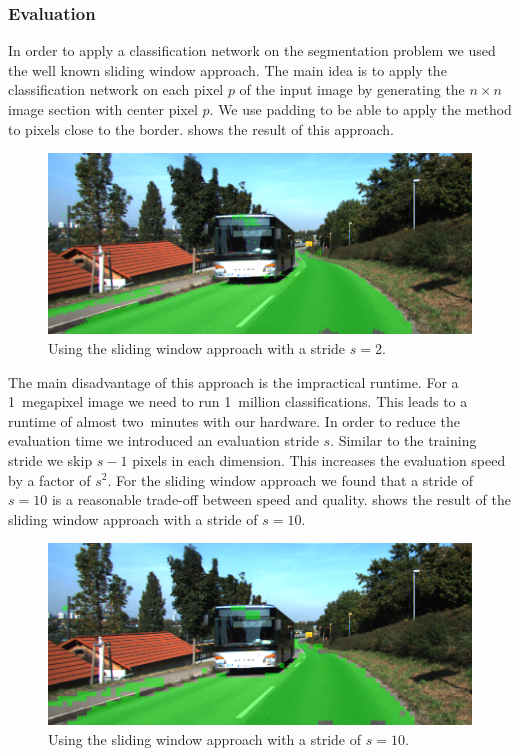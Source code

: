 \subsubsection{Evaluation}
In order to apply a classification network on the segmentation problem we used
the well known sliding window approach. The main idea is to apply the
classification network on each pixel $p$ of the input image by generating the
$n \times n$ image section with center pixel $p$. We use padding to be able to
apply the method to pixels close to the border.  shows the
result of this approach.

\begin{figure}[H]
	\centering
	\includegraphics[width=\columnwidth]{figures/models/testing2-um_32_sliding_stride2.png}
	\caption{Using the sliding window approach with a stride $s=2$.}
	\label{fig:stride2}
\end{figure}

The main disadvantage of this approach is the impractical runtime. For a
1~megapixel image we need to run 1~million classifications. This leads to a
runtime of almost two~minutes with our hardware. In order to reduce the
evaluation time we introduced an evaluation stride $s$. Similar to the training
stride we skip $s-1$ pixels in each dimension. This increases the evaluation
speed by a factor of $s^2$. For the sliding window approach we found that a
stride of $s = 10$ is a reasonable trade-off between speed and quality.
 shows the result of the sliding window approach with a
stride of $s=10$.



\begin{figure}[H]
	\centering
	\includegraphics[width=\columnwidth]{figures/models/testing2-um_32_sliding_stride10.png}
	\caption{Using the sliding window approach with a stride of $s=10$.}
	\label{fig:stride10}
\end{figure}



